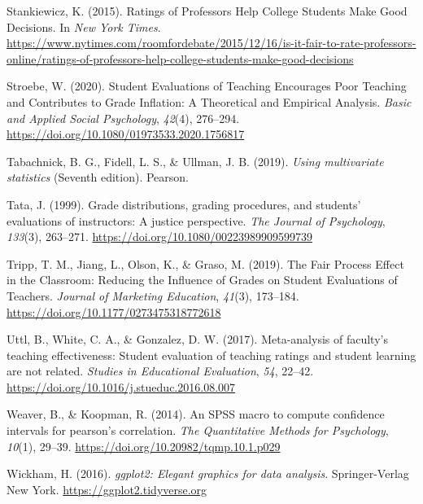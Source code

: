 \documentclass[
  man]{apa7}
\newlength{\cslhangindent}
\newlength{\cslentryspacingunit} %
\newenvironment{CSLReferences}[2] %
 {%
  \setlength{\parindent}{0pt}
  \ifodd #1
  \let\oldpar\par
  \def\par{\hangindent=\cslhangindent\oldpar}
  \fi
  \setlength{\parskip}{#2\cslentryspacingunit}
 }%
 {}
\begin{document}
\begin{CSLReferences}{1}{0}
\leavevmode{}%
Stankiewicz, K. (2015). Ratings of {Professors} {Help} {College} {Students} {Make} {Good} {Decisions}. In \emph{New York Times}. \url{https://www.nytimes.com/roomfordebate/2015/12/16/is-it-fair-to-rate-professors-online/ratings-of-professors-help-college-students-make-good-decisions}

\leavevmode{}%
Stroebe, W. (2020). Student Evaluations of Teaching Encourages Poor Teaching and Contributes to Grade Inflation: A Theoretical and Empirical Analysis. \emph{Basic and Applied Social Psychology}, \emph{42}(4), 276--294. \url{https://doi.org/10.1080/01973533.2020.1756817}

\leavevmode{}%
Tabachnick, B. G., Fidell, L. S., \& Ullman, J. B. (2019). \emph{Using multivariate statistics} (Seventh edition). Pearson.

\leavevmode{}%
Tata, J. (1999). Grade distributions, grading procedures, and students' evaluations of instructors: A justice perspective. \emph{The Journal of Psychology}, \emph{133}(3), 263--271. \url{https://doi.org/10.1080/00223989909599739}

\leavevmode{}%
Tripp, T. M., Jiang, L., Olson, K., \& Graso, M. (2019). The Fair Process Effect in the Classroom: Reducing the Influence of Grades on Student Evaluations of Teachers. \emph{Journal of Marketing Education}, \emph{41}(3), 173--184. \url{https://doi.org/10.1177/0273475318772618}

\leavevmode{}%
Uttl, B., White, C. A., \& Gonzalez, D. W. (2017). Meta-analysis of faculty's teaching effectiveness: Student evaluation of teaching ratings and student learning are not related. \emph{Studies in Educational Evaluation}, \emph{54}, 22--42. \url{https://doi.org/10.1016/j.stueduc.2016.08.007}

\leavevmode{}%
Weaver, B., \& Koopman, R. (2014). An SPSS macro to compute confidence intervals for pearson{'}s correlation. \emph{The Quantitative Methods for Psychology}, \emph{10}(1), 29--39. \url{https://doi.org/10.20982/tqmp.10.1.p029}

\leavevmode{}%
Wickham, H. (2016). \emph{ggplot2: Elegant graphics for data analysis}. Springer-Verlag New York. \url{https://ggplot2.tidyverse.org}


\end{CSLReferences}
\end{document}
